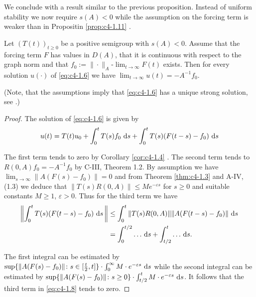 We conclude with a result similar to the previous proposition.
Instead of uniform stability we now require $s(A) < 0$ while the assumption on the forcing term is weaker than in Propositin \ref{prop:c4-1.11} .

\begin{proposition}\label{prop:c4-1.12}
Let $(T(t))_{t \geq 0}$ be a positive semigroup with $s(A) < 0$.
Assume that the forcing term $F$ has values in $D(A)$, that it is continuous with respect to the graph norm and that $f_{0} := \|\cdot\|_{A}$-$\lim_{t \to \infty} F(t)$ exists.
Then for every solution $u(\cdot)$ of \eqref{eq:c4-1.6} we have $\lim_{t \to \infty} u(t) = -A^{-1}f_{0}$.

(Note, that the assumptions imply that \eqref{eq:c4-1.6} has a unique strong solution, see \citet[ Theorem~4.2.4]{pazy:1983}.)
\end{proposition}

\begin{proof}
The solution of \eqref{eq:c4-1.6} is given by
\begin{equation}\label{eq:c4-1.8}
u(t) = T(t)u_{0} + \int_{0}^{t} T(s)f_{0} \, \mathop{}\!\mathrm{d}{s} + \int_{0}^{t} T(s)(F(t-s)-f_{0}) \, \mathop{}\!\mathrm{d}{s}
\end{equation}

The first term tends to zero by Corollary \ref{cor:c4-1.4} .
The second term tends to $R(0,A)f_{0} = -A^{-1}f_{0}$ by C-III, Theorem 1.2.
By assumption we have $\lim_{s \to \infty}\|A(F(s)-f_{0})\| = 0$ and from Theorem \ref{thm:c4-1.3} and A-IV, (1.3) we deduce that $\|T(s)R(0,A)\| \leq Me^{-\varepsilon s}$ for $s \geq 0$ and suitable constants $M \geq 1$, $\varepsilon > 0$.
Thus for the third term we have
\begin{align*}
\left\|\int_{0}^{t} T(s)(F(t-s)-f_{0}) \, \mathop{}\!\mathrm{d}{s}\,\right\| &\leq \int_{0}^{t} \|T(s)R(0,A)\| \|A(F(t-s)-f_{0})\| \, \mathop{}\!\mathrm{d}{s} \\
&= \int_{0}^{t/2} \ldots \, \mathop{}\!\mathrm{d}{s} + \int_{t/2}^{t} \ldots \, \mathop{}\!\mathrm{d}{s}.
\end{align*}

The first integral can be estimated by\\ $\sup\{\|A(F(s)-f_{0})\| \colon s \in [\frac{t}{2},t]\} \cdot \int_{0}^{\infty} M \cdot e^{-\varepsilon s} \, \mathop{}\!\mathrm{d}{s}$ while the second integral can be estimated by $\sup\{\|A(F(s)-f_{0})\| \colon s \geq 0\} \cdot \int_{t/2}^{t} M \cdot e^{- \varepsilon s} \, \mathop{}\!\mathrm{d}{s}$.
It follows that the third term in \eqref{eq:c4-1.8} tends to zero.
\end{proof}



